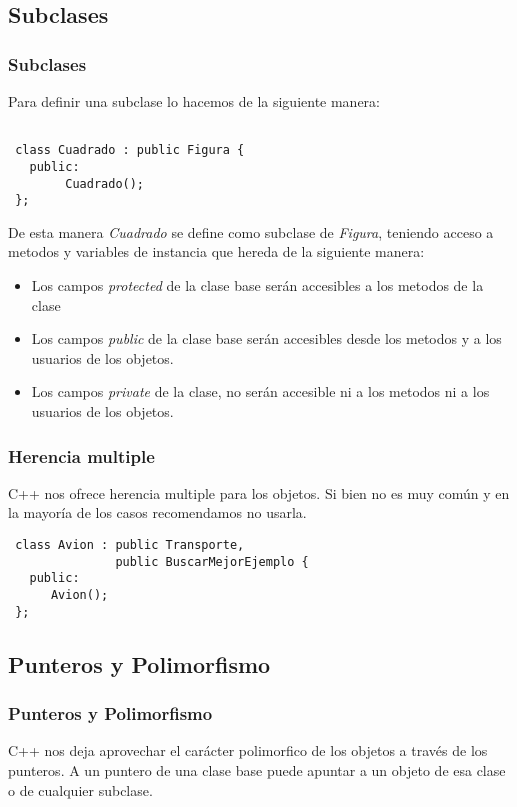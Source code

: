 \documentclass{beamer}
\begin{document}
\subsection{Subclases}
\begin{frame}[fragile]
\frametitle{Subclases}

Para definir una subclase lo hacemos de la siguiente manera:

\begin{verbatim}

 class Cuadrado : public Figura {
   public:
        Cuadrado(); 
 };
\end{verbatim}

De esta manera \emph{Cuadrado} se define como subclase de \emph{Figura}, teniendo acceso a 
metodos y variables de instancia que hereda de la siguiente manera:
\begin{itemize}
 \item Los campos \emph{protected} de la clase base serán accesibles a los metodos de la clase
 \item Los campos \emph{public} de la clase base serán accesibles desde los metodos y a los usuarios de los objetos.
 \item Los campos \emph{private} de la clase, no serán accesible ni a los metodos ni a los usuarios de los objetos.
\end{itemize}
\end{frame}

\begin{frame}[fragile]
\frametitle{Herencia multiple}
C++ nos ofrece herencia multiple para los objetos. 
Si bien no es muy común y en la mayoría de los casos recomendamos no usarla.

\begin{verbatim}
 class Avion : public Transporte,
               public BuscarMejorEjemplo {
   public:
      Avion();
 };
\end{verbatim}

\end{frame}

\subsection{Punteros y Polimorfismo}
\begin{frame}
\frametitle{Punteros y Polimorfismo}
C++ nos deja aprovechar el carácter polimorfico de los objetos a través de los punteros.
A un puntero de una clase base puede apuntar a un objeto de esa clase o de cualquier subclase.

\end{frame}
\end{document}
